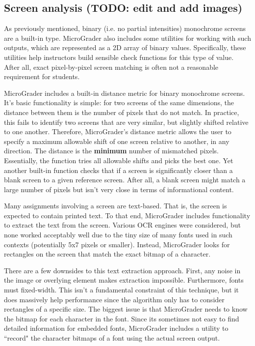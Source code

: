 \documentclass[12pt]{article}
\begin{document}
\subsection{Screen analysis (TODO: edit and add images)}
As previously mentioned, binary (i.e. no partial intensities) monochrome screens are a built-in type.  MicroGrader also includes some utilities for working with such outputs, which are represented as a 2D array of binary values.  Specifically, these utilities help instructors build sensible check functions for this type of value.  After all, exact pixel-by-pixel screen matching is often not a reasonable requirement for students.

MicroGrader includes a built-in distance metric for binary monochrome screens.  It's basic functionality is simple: for two screens of the same dimensions, the distance between them is the number of pixels that do not match.  In practice, this fails to identify two screens that are very similar, but slightly shifted relative to one another.  Therefore, MicroGrader's distance metric allows the user to specify a maximum allowable shift of one screen relative to another, in any direction.  The distance is the \textbf{minimum} number of mismatched pixels.  Essentially, the function tries all allowable shifts and picks the best one.  Yet another built-in function checks that if a screen is significantly closer than a blank screen to a given reference screen.  After all, a blank screen might match a large number of pixels but isn't very close in terms of informational content.

Many assignments involving a screen are text-based.  That is, the screen is expected to contain printed text.  To that end, MicroGrader includes functionality to extract the text from the screen.  Various OCR engines were considered, but none worked acceptably well due to the tiny size of many fonts used in such contexts (potentially 5x7 pixels or smaller).  Instead, MicroGrader looks for rectangles on the screen that match the exact bitmap of a character.

There are a few downsides to this text extraction approach.  First, any noise in the image or overlying element makes extraction impossible.  Furthermore, fonts must fixed-width.  This isn't a fundamental constraint of this technique, but it does massively help performance since the algorithm only has to consider rectangles of a specific size.  The biggest issue is that MicroGrader needs to know the bitmap for each character in the font.  Since its sometimes not easy to find detailed information for embedded fonts, MicroGrader includes a utility to ``record" the character bitmaps of a font using the actual screen output.
\end{document}
